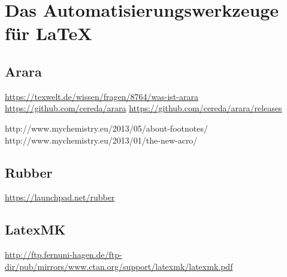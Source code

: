 \chapter{Das Automatisierungswerkzeuge für \LaTeX}

\section{Arara}
\url{https://texwelt.de/wissen/fragen/8764/was-ist-arara}
\url{https://github.com/cereda/arara}
\url{https://github.com/cereda/arara/releases}

http://www.mychemistry.eu/2013/05/about-footnotes/
http://www.mychemistry.eu/2013/01/the-new-acro/
\section{Rubber}
\url{https://launchpad.net/rubber}
\section{LatexMK}
\url{http://ftp.fernuni-hagen.de/ftp-dir/pub/mirrors/www.ctan.org/support/latexmk/latexmk.pdf}
